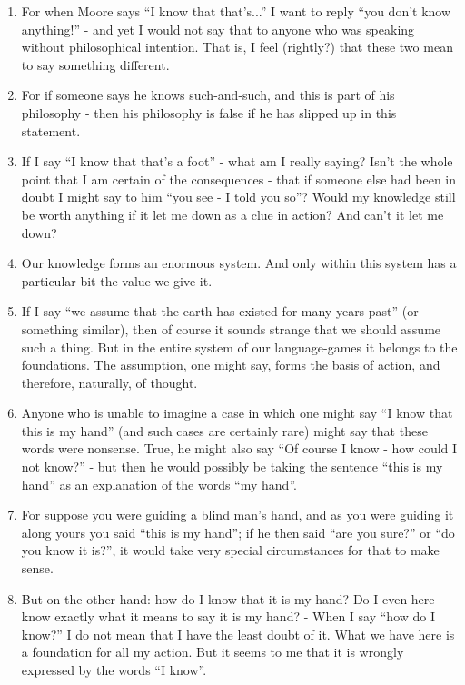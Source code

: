 \documentclass{book}
\begin{document}
\begin{enumerate}
\item
For when Moore says ``I know that that's...'' I want to reply ``you don't know
anything!'' - and yet I would not say that to anyone who was speaking without
philosophical intention. That is, I feel (rightly?) that these two mean to say
something different.

\item
For if someone says he knows such-and-such, and this is part of his philosophy
- then his philosophy is false if he has slipped up in this statement.

\item
If I say ``I know that that's a foot'' - what am I really saying? Isn't the
whole point that I am certain of the consequences - that if someone else had
been in doubt I might say to him ``you see - I told you so''? Would my
knowledge still be worth anything if it let me down as a clue in action? And
can't it let me down?

\item
Our knowledge forms an enormous system. And only within this system has a
particular bit the value we give it.

\item
If I say ``we assume that the earth has existed for many years past'' (or
something similar), then of course it sounds strange that we should assume such
a thing. But in the entire system of our language-games it belongs to the
foundations. The assumption, one might say, forms the basis of action, and
therefore, naturally, of thought.

\item
Anyone who is unable to imagine a case in which one might say ``I know that
this is my hand'' (and such cases are certainly rare) might say that these
words were nonsense. True, he might also say ``Of course I know - how could I
not know?'' - but then he would possibly be taking the sentence ``this is my
hand'' as an explanation of the words ``my hand''.

\item
For suppose you were guiding a blind man's hand, and as you were guiding it
along yours you said ``this is my hand''; if he then said ``are you sure?'' or
``do you know it is?'', it would take very special circumstances for that to
make sense.

\item
But on the other hand: how do I know that it is my hand? Do I even here know
exactly what it means to say it is my hand? - When I say ``how do I know?'' I
do not mean that I have the least doubt of it. What we have here is a
foundation for all my action. But it seems to me that it is wrongly expressed
by the words ``I know''.


\end{enumerate}
\end{document}

